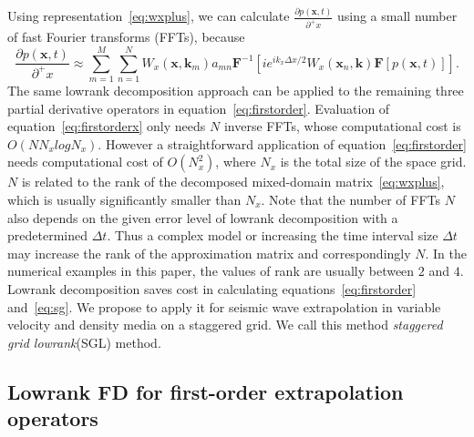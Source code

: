 Using representation~\ref{eq:wxplus}, we can calculate $\displaystyle \frac{\partial p(\mathbf{x},t)}{\partial^+x}$ using a small number of fast Fourier transforms (FFTs), because
\begin{equation}
\label{eq:firstorderx}
\displaystyle \frac{\partial p(\mathbf{x},t)}{\partial^+x} \approx \sum\limits_{m=1}^M \sum\limits_{n=1}^NW_x(\mathbf{x},\mathbf{k}_m)a_{mn}\mathbf{F}^{-1}\left[ie^{ik_x\Delta x/2}W_x(\mathbf{x}_n, \mathbf{k})\mathbf{F}\left[p(\mathbf{x},t)\right]\right].
\end{equation}
The same lowrank decomposition approach can be applied to the remaining three partial derivative operators in equation~\ref{eq:firstorder}. Evaluation of equation~\ref{eq:firstorderx} only needs $N$ inverse FFTs, whose computational cost is $O(NN_xlogN_x)$. However a straightforward application of equation~\ref{eq:firstorder} needs computational cost of $O(N^2_x)$, where $N_x$ is the total size of the space grid. $N$ is related to the rank of the decomposed mixed-domain matrix~\ref{eq:wxplus}, which is usually significantly smaller than $N_x$. Note that the number of FFTs $N$ also depends on the given error level of lowrank decomposition with a predetermined $\Delta t$. Thus a complex model or increasing the time interval size $\Delta t$ may increase the rank of the approximation matrix and correspondingly $N$. In the numerical examples in this paper, the values of rank are usually between $2$ and $4$. Lowrank decomposition saves cost in calculating equations~\ref{eq:firstorder} and~\ref{eq:sg}. We propose to apply it for seismic wave extrapolation in variable velocity and density media on a staggered grid. We call this method \emph{staggered grid lowrank}(SGL) method.  


\subsection{Lowrank FD for first-order extrapolation operators}



